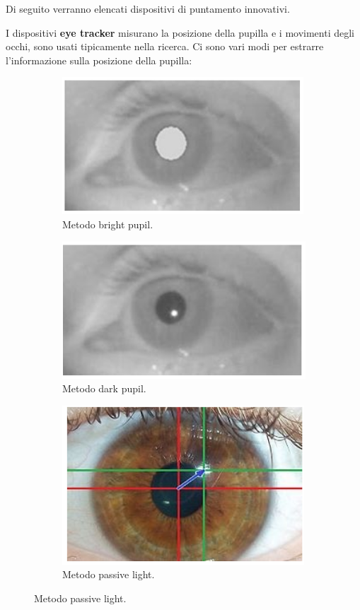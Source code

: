 Di seguito verranno elencati dispositivi di puntamento innovativi.

I dispositivi \textbf{eye tracker} misurano la posizione della pupilla e i movimenti degli occhi, sono usati tipicamente nella ricerca. Ci sono vari
modi per estrarre l'informazione sulla posizione della pupilla:

\begin{figure}[!h]
	\centering
	\begin{subfigure}[!h]{0.3 \textwidth}
		\centering
		\includegraphics[scale=0.15]{immagini/bright-pupil.png}
		\caption{Metodo bright pupil.}
	\end{subfigure}
	\begin{subfigure}[!h]{0.3 \textwidth}
		\centering
		\includegraphics[scale=0.15]{immagini/dark-pupil.png}
		\caption{Metodo dark pupil.}
	\end{subfigure}
	\begin{subfigure}[!h]{0.3 \textwidth}
		\centering
		\includegraphics[scale=0.15]{immagini/passive-light.png}
		\caption{Metodo passive light.}
	\end{subfigure}
\end{figure}


